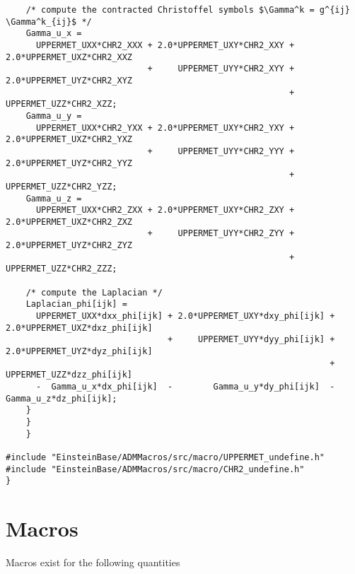 \begin{verbatim}
    /* compute the contracted Christoffel symbols $\Gamma^k = g^{ij} \Gamma^k_{ij}$ */
    Gamma_u_x =
      UPPERMET_UXX*CHR2_XXX + 2.0*UPPERMET_UXY*CHR2_XXY + 2.0*UPPERMET_UXZ*CHR2_XXZ
                            +     UPPERMET_UYY*CHR2_XYY + 2.0*UPPERMET_UYZ*CHR2_XYZ
                                                        +     UPPERMET_UZZ*CHR2_XZZ;
    Gamma_u_y =
      UPPERMET_UXX*CHR2_YXX + 2.0*UPPERMET_UXY*CHR2_YXY + 2.0*UPPERMET_UXZ*CHR2_YXZ
                            +     UPPERMET_UYY*CHR2_YYY + 2.0*UPPERMET_UYZ*CHR2_YYZ
                                                        +     UPPERMET_UZZ*CHR2_YZZ;
    Gamma_u_z =
      UPPERMET_UXX*CHR2_ZXX + 2.0*UPPERMET_UXY*CHR2_ZXY + 2.0*UPPERMET_UXZ*CHR2_ZXZ
                            +     UPPERMET_UYY*CHR2_ZYY + 2.0*UPPERMET_UYZ*CHR2_ZYZ
                                                        +     UPPERMET_UZZ*CHR2_ZZZ;

    /* compute the Laplacian */
    Laplacian_phi[ijk] =
      UPPERMET_UXX*dxx_phi[ijk] + 2.0*UPPERMET_UXY*dxy_phi[ijk] + 2.0*UPPERMET_UXZ*dxz_phi[ijk]
                                +     UPPERMET_UYY*dyy_phi[ijk] + 2.0*UPPERMET_UYZ*dyz_phi[ijk]
                                                                +     UPPERMET_UZZ*dzz_phi[ijk]
      -  Gamma_u_x*dx_phi[ijk]  -        Gamma_u_y*dy_phi[ijk]  -        Gamma_u_z*dz_phi[ijk];
    }
    }
    }

#include "EinsteinBase/ADMMacros/src/macro/UPPERMET_undefine.h"
#include "EinsteinBase/ADMMacros/src/macro/CHR2_undefine.h"
}
\end{verbatim}
\endgroup


\section{Macros}
\label{admmacros:macros}
Macros exist for the following quantities

